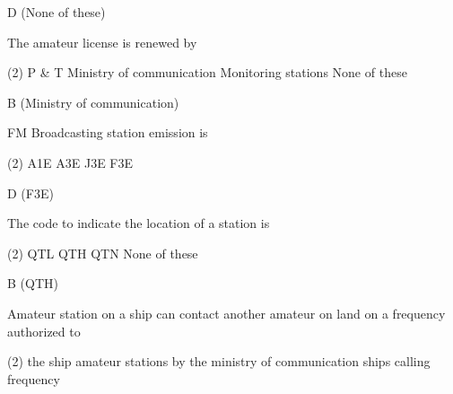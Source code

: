 \documentclass[a4paper]{article}
\begin{document}
\begin{solution}
	D (None of these)
\end{solution}

\vspace{5mm}



\begin{question}The amateur license is renewed by
	\begin{tasks}(2)
		\task P \& T
		\task Ministry of communication
		\task Monitoring stations
		\task None of these
	\end{tasks}
\end{question}

\begin{solution}
	B (Ministry of communication)
\end{solution}

\vspace{5mm}



\begin{question}FM Broadcasting station emission is
	\begin{tasks}(2)
		\task A1E
		\task A3E
		\task J3E
		\task F3E
	\end{tasks}
\end{question}

\begin{solution}
	D (F3E)
\end{solution}

\vspace{5mm}



\begin{question}The code to indicate the location of a station is
	\begin{tasks}(2)
		\task QTL
		\task QTH
		\task QTN
		\task None of these
	\end{tasks}
\end{question}

\begin{solution}
	B (QTH)
\end{solution}

\vspace{5mm}



\begin{question}Amateur station on a ship can contact another amateur on land on a frequency authorized to
	\begin{tasks}(2)
		\task the ship
		\task amateur stations
		\task by the ministry of communication
		\task ships calling frequency
	\end{tasks}
\end{question}
\end{document}
